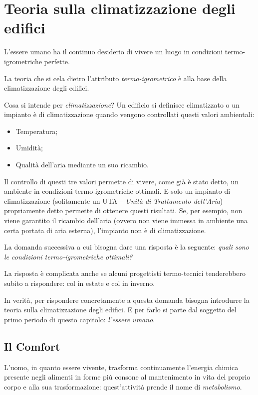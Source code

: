 \chapter{Teoria sulla climatizzazione degli edifici}
\thispagestyle{empty}
L'essere umano ha il continuo desiderio di vivere un luogo in condizioni termo-igrometriche perfette. 

La teoria che si cela dietro l'attributo \emph{termo-igrometrico} è alla base della climatizzazione degli edifici.

Cosa si intende per \emph{climatizzazione}? Un edificio si definisce climatizzato o un impianto è di climatizzazione quando vengono controllati questi valori ambientali:
\begin{itemize}
	\item Temperatura;
	\item Umidità;
	\item Qualità dell'aria mediante un suo ricambio.
\end{itemize}
Il controllo di questi tre valori permette di vivere, come già è stato detto, un ambiente in condizioni termo-igrometriche ottimali. E solo un impianto di climatizzazione (solitamente un UTA -- \emph{Unità di Trattamento dell'Aria}) propriamente detto permette di ottenere questi risultati. Se, per esempio, non viene garantito il ricambio dell'aria (ovvero non viene immessa in ambiente una certa portata di aria esterna), l'impianto non è di climatizzazione.

La domanda successiva a cui bisogna dare una risposta è la seguente: \emph{quali sono le condizioni termo-igrometriche ottimali?}

La risposta è complicata anche se alcuni progettisti termo-tecnici tenderebbero subito a rispondere:  col  in estate e  col  in inverno.

In verità, per rispondere concretamente a questa domanda bisogna introdurre la teoria sulla climatizzazione degli edifici. E per farlo si parte dal soggetto del primo periodo di questo capitolo: \emph{l'essere umano}.

\section{Il Comfort}
L'uomo, in quanto essere vivente, trasforma continuamente l'energia chimica presente negli alimenti in forme più consone al mantenimento in vita del proprio corpo e alla sua trasformazione: quest'attività prende il nome di \emph{metabolismo}.

